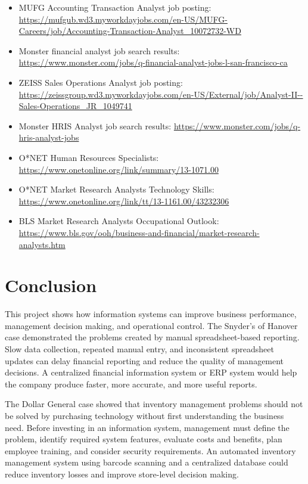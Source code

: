 \documentclass[12pt]{article}
\begin{document}
\begin{itemize}
    \item MUFG Accounting Transaction Analyst job posting:
    \url{https://mufgub.wd3.myworkdayjobs.com/en-US/MUFG-Careers/job/Accounting-Transaction-Analyst_10072732-WD}
    
    \item Monster financial analyst job search results:
    \url{https://www.monster.com/jobs/q-financial-analyst-jobs-l-san-francisco-ca}
    
    \item ZEISS Sales Operations Analyst job posting:
    \url{https://zeissgroup.wd3.myworkdayjobs.com/en-US/External/job/Analyst-II--Sales-Operations_JR_1049741}
    
    \item Monster HRIS Analyst job search results:
    \url{https://www.monster.com/jobs/q-hris-analyst-jobs}
    
    \item O*NET Human Resources Specialists:
    \url{https://www.onetonline.org/link/summary/13-1071.00}
    
    \item O*NET Market Research Analysts Technology Skills:
    \url{https://www.onetonline.org/link/tt/13-1161.00/43232306}
    
    \item BLS Market Research Analysts Occupational Outlook:
    \url{https://www.bls.gov/ooh/business-and-financial/market-research-analysts.htm}
\end{itemize}


\section{Conclusion}

This project shows how information systems can improve business performance,
management decision making, and operational control. The Snyder's of Hanover case
demonstrated the problems created by manual spreadsheet-based reporting. Slow
data collection, repeated manual entry, and inconsistent spreadsheet updates can
delay financial reporting and reduce the quality of management decisions. A
centralized financial information system or ERP system would help the company
produce faster, more accurate, and more useful reports.

The Dollar General case showed that inventory management problems should not be
solved by purchasing technology without first understanding the business need.
Before investing in an information system, management must define the problem,
identify required system features, evaluate costs and benefits, plan employee
training, and consider security requirements. An automated inventory management
system using barcode scanning and a centralized database could reduce inventory
losses and improve store-level decision making.
\end{document}

